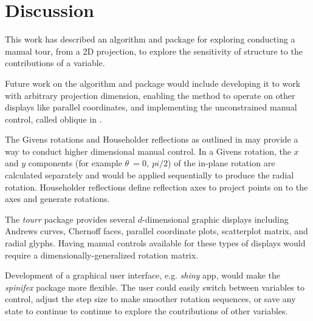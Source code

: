 \documentclass{monashthesis}
\begin{document}
\section{Discussion}\label{sec:discussion_paper}

This work has described an algorithm and package for exploring
conducting a manual tour, from a 2D projection, to explore the
sensitivity of structure to the contributions of a variable.

Future work on the algorithm and package would include developing it to
work with arbitrary projection dimension, enabling the method to operate
on other displays like parallel coordinates, and implementing the
unconstrained manual control, called oblique in
\textcite{cook_manual_1997}.

The Givens rotations and Householder reflections as outlined in
\textcite{buja_computational_2005} may provide a way to conduct higher
dimensional manual control. In a Givens rotation, the \(x\) and \(y\)
components (for example \(\theta~= 0,~pi/2\)) of the in-plane rotation
are calculated separately and would be applied sequentially to produce
the radial rotation. Householder reflections define reflection axes to
project points on to the axes and generate rotations.

The \emph{tourr} package provides several \(d\)-dimensional graphic
displays including Andrews curves, Chernoff faces, parallel coordinate
plots, scatterplot matrix, and radial glyphs. Having manual controls
available for these types of displays would require a
dimensionally-generalized rotation matrix.

Development of a graphical user interface, e.g. \emph{shiny} app, would
make the \emph{spinifex} package more flexible. The user could easily
switch between variables to control, adjust the step size to make
smoother rotation sequences, or save any state to continue to continue
to explore the contributions of other variables.

\printbibliography[heading=bibintoc]
\end{document}
